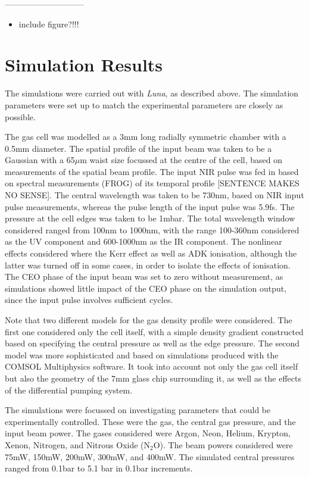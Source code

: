 \documentclass[a4paper]{jpconf}
\begin{document}
-----------------------------
\begin{itemize}
\item include figure?!!!
\end{itemize}



\section{Simulation Results}

The simulations were carried out with \emph{Luna}, as described above. The simulation parameters were set up to match the experimental parameters are closely as possible. \par 
 The gas cell was modelled as a 3mm long radially symmetric chamber with a 0.5mm diameter. The spatial profile of the input beam was taken to be a Gaussian with a 65$\mu$m waist size focussed at the centre of the cell, based on measurements of the spatial beam profile. The input NIR pulse was fed in based on spectral measurements (FROG) of its temporal profile [SENTENCE MAKES NO SENSE]. The central wavelength was taken to be 730nm, based on NIR input pulse measurements, whereas the pulse length of the input pulse was 5.9fs. The pressure at the cell edges was taken to be 1mbar. The total wavelength window considered ranged from 100nm to 1000nm, with the range 100-360nm considered as the UV component and 600-1000nm as the IR component. The nonlinear effects considered where the Kerr effect as well as ADK ionisation, although the latter was turned off in some cases, in order to isolate the effects of ionisation. The CEO phase of the input beam was set to zero without measurement, as simulations showed little impact of the CEO phase on the simulation output, since the input pulse involves sufficient cycles. \par 
Note that two different models for the gas density profile were considered. The first one considered only the cell itself, with a simple density gradient constructed based on specifying the central pressure as well as the edge pressure. The second model was more sophisticated and based on simulations produced with the COMSOL Multiphysics software. It took into account not only the gas cell itself but also the geometry of the 7mm glass chip surrounding it, as well as the effects of the differential pumping system. \par 
The simulations were focussed on investigating parameters that could be experimentally controlled. These were the gas, the central gas pressure, and the input beam power. The gases considered were Argon, Neon, Helium, Krypton, Xenon, Nitrogen, and Nitrous Oxide (N$_2$O). The beam powers considered were 75mW, 150mW, 200mW, 300mW, and 400mW. The simulated central pressures ranged from 0.1bar to 5.1 bar in 0.1bar increments. \par 
\end{document}
